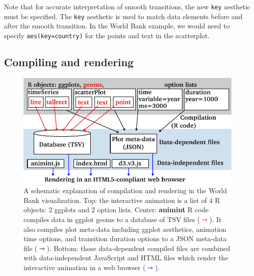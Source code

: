 \documentclass[12pt,]{article}
\newenvironment{Shaded}{\begin{snugshade}}{\end{snugshade}}
\newcommand{\DataTypeTok}[1]{\textcolor[rgb]{0.13,0.29,0.53}{#1}}
\newcommand{\DecValTok}[1]{\textcolor[rgb]{0.00,0.00,0.81}{#1}}
\newcommand{\KeywordTok}[1]{\textcolor[rgb]{0.13,0.29,0.53}{\textbf{#1}}}
\newcommand{\NormalTok}[1]{#1}
\newcommand{\OperatorTok}[1]{\textcolor[rgb]{0.81,0.36,0.00}{\textbf{#1}}}
\newcommand{\StringTok}[1]{\textcolor[rgb]{0.31,0.60,0.02}{#1}}
\theoremstyle{definition}
\theoremstyle{definition}
\theoremstyle{definition}
\theoremstyle{remark}
\begin{document}
\begin{Shaded}
\end{Shaded}

Note that for accurate interpretation of smooth transitions, the new
\texttt{key} aesthetic must be specified. The \texttt{key} aesthetic is
used to match data elements before and after the smooth transition. In
the World Bank example, we would need to specify
\texttt{aes(key=country)} for the points and text in the scatterplot.

\hypertarget{compiling-and-rendering}{%
\subsection{Compiling and rendering}\label{compiling-and-rendering}}

\begin{figure}
\centering
\includegraphics{images/figure-design.pdf}
\caption{\label{fig:design}A schematic explanation of compilation and
rendering in the World Bank visualization. Top: the interactive
animation is a list of 4 R objects: 2 ggplots and 2 option lists.
Center: \textbf{animint} R code compiles data in ggplot geoms to a
database of TSV files (\textcolor{red}{$\rightarrowtriangle$}). It also
compiles plot meta-data including ggplot aesthetics, animation time
options, and transition duration options to a JSON meta-data file
(\(\rightarrowtriangle\)). Bottom: those data-dependent compiled files
are combined with data-independent JavaScript and HTML files which
render the interactive animation in a web browser
(\textcolor{blue}{$\rightarrowtriangle$}).}
\end{figure}
\end{document}
